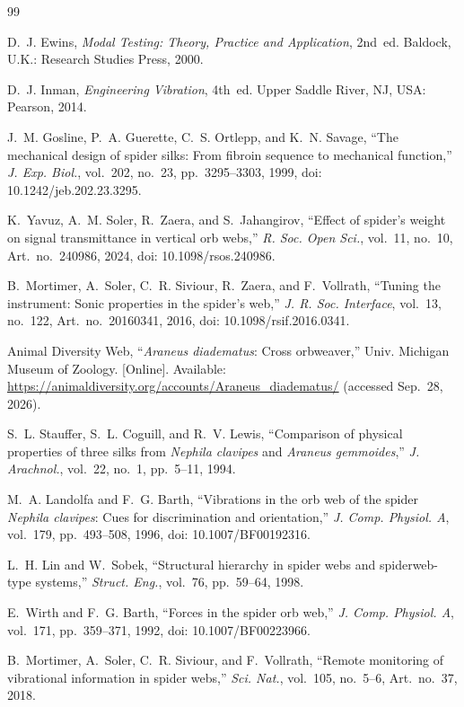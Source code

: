 \documentclass[11pt,letterpaper]{article}
\begin{document}
\begin{thebibliography}{99}

D.~J. Ewins, \textit{Modal Testing: Theory, Practice and Application}, 2nd~ed.
Baldock, U.K.: Research Studies Press, 2000.

D.~J. Inman, \textit{Engineering Vibration}, 4th~ed.
Upper Saddle River, NJ, USA: Pearson, 2014.

J.~M. Gosline, P.~A. Guerette, C.~S. Ortlepp, and K.~N. Savage,
``The mechanical design of spider silks: From fibroin sequence to mechanical
function,'' \textit{J. Exp. Biol.}, vol.~202, no.~23, pp.~3295--3303, 1999,
doi: 10.1242/jeb.202.23.3295.

K.~Yavuz, A.~M. Soler, R.~Zaera, and S.~Jahangirov,
``Effect of spider's weight on signal transmittance in vertical orb webs,''
\textit{R. Soc. Open Sci.}, vol.~11, no.~10, Art.~no.~240986, 2024,
doi: 10.1098/rsos.240986.

B.~Mortimer, A.~Soler, C.~R. Siviour, R.~Zaera, and F.~Vollrath,
``Tuning the instrument: Sonic properties in the spider's web,''
\textit{J. R. Soc. Interface}, vol.~13, no.~122, Art.~no.~20160341, 2016,
doi: 10.1098/rsif.2016.0341.

Animal Diversity Web, ``\textit{Araneus diadematus}: Cross orbweaver,''
Univ. Michigan Museum of Zoology. [Online]. Available:
\url{https://animaldiversity.org/accounts/Araneus_diadematus/}
(accessed Sep.~28, 2026).

S.~L. Stauffer, S.~L. Coguill, and R.~V. Lewis,
``Comparison of physical properties of three silks from \textit{Nephila
clavipes} and \textit{Araneus gemmoides},'' \textit{J. Arachnol.}, vol.~22,
no.~1, pp.~5--11, 1994.

M.~A. Landolfa and F.~G. Barth,
``Vibrations in the orb web of the spider \textit{Nephila clavipes}: Cues for
discrimination and orientation,'' \textit{J. Comp. Physiol. A}, vol.~179,
pp.~493--508, 1996, doi: 10.1007/BF00192316.

L.~H. Lin and W.~Sobek,
``Structural hierarchy in spider webs and spiderweb-type systems,''
\textit{Struct. Eng.}, vol.~76, pp.~59--64, 1998.

E.~Wirth and F.~G. Barth, ``Forces in the spider orb web,''
\textit{J. Comp. Physiol. A}, vol.~171, pp.~359--371, 1992,
doi: 10.1007/BF00223966.

B.~Mortimer, A.~Soler, C.~R. Siviour, and F.~Vollrath,
``Remote monitoring of vibrational information in spider webs,''
\textit{Sci. Nat.}, vol.~105, no.~5--6, Art.~no.~37, 2018.

\end{thebibliography}
\end{document}
